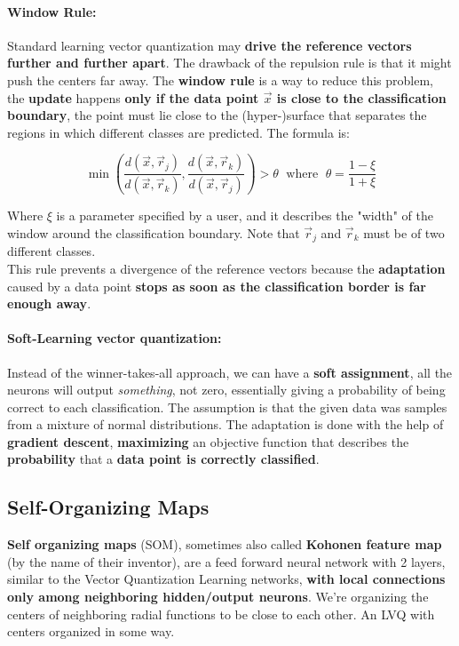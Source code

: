 \paragraph{Window Rule:} Standard learning vector quantization may \textbf{drive the reference vectors further and further apart}. The drawback of the repulsion rule is that it might push the centers far away. The \textbf{window rule} is a way to reduce this problem, the \textbf{update} happens \textbf{only if the data point $\vec{x}$ is close to the classification boundary}, the point must lie close to the (hyper-)surface that separates the regions in which different classes are predicted. The formula is:

$$ \min\left(\frac{d(\vec{x}, \vec{r}_j)}{d(\vec{x}, \vec{r}_k)}, \frac{d(\vec{x}, \vec{r}_k)}{d(\vec{x}, \vec{r}_j)}\right) > \theta \; \text{ where } \; \theta = \frac{1 - \xi}{1 + \xi} $$

Where $\xi$ is a parameter specified by a user, and it describes the "width" of the window around the classification boundary. Note that $\vec{r}_j$ and $\vec{r}_k$ must be of two different classes.\\

This rule prevents a divergence of the reference vectors because the \textbf{adaptation} caused by a data point \textbf{stops as soon as the classification border is far enough away}.\\

\paragraph{Soft-Learning vector quantization:} Instead of the winner-takes-all approach, we can have a \textbf{soft assignment}, all the neurons will output \textit{something}, not zero, essentially giving a probability of being correct to each classification. The assumption is that the given data was samples from a mixture of normal distributions. The adaptation is done with the help of \textbf{gradient descent}, \textbf{maximizing} an objective function that describes the \textbf{probability} that a \textbf{data point is correctly classified}.


\newpage

\subsection{Self-Organizing Maps}
\textbf{Self organizing maps} (SOM), sometimes also called \textbf{Kohonen feature map} (by the name of their inventor), are a feed forward neural network with 2 layers, similar to the Vector Quantization Learning networks, \textbf{with local connections only among neighboring hidden/output neurons}. We're organizing the centers of neighboring radial functions to be close to each other. An LVQ with centers organized in some way. \\

